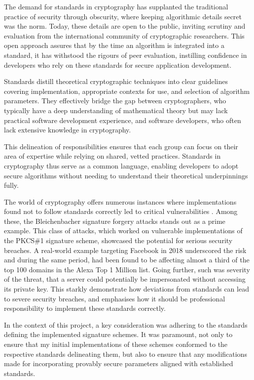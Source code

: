 \documentclass[]{final_report}
\theoremstyle{definition}
\begin{document}
The demand for standards in cryptography has supplanted the traditional practice of security through obscurity, where keeping algorithmic details secret was the norm. Today, these details are open to the public, inviting scrutiny and evaluation from the international community of cryptographic researchers. This open approach assures that by the time an algorithm is integrated into a standard, it has withstood the rigours of peer evaluation, instilling confidence in developers who rely on these standards for secure application development.

Standards distill theoretical cryptographic techniques into clear guidelines covering implementation, appropriate contexts for use, and selection of algorithm parameters. They effectively bridge the gap between cryptographers, who typically have a deep understanding of mathematical theory but may lack practical software development experience, and software developers, who often lack extensive knowledge in cryptography.

This delineation of responsibilities ensures that each group can focus on their area of expertise while relying on shared, vetted practices. Standards in cryptography thus serve as a common language, enabling developers to adopt secure algorithms without needing to understand their theoretical underpinnings fully.


The world of cryptography offers numerous instances where implementations found not to follow standards correctly led to critical vulnerabilities \cite{4223237, 10.1145/2382196.2382205, 10.1145/2382196.2382204,  bleichenbacher1998chosen}. Among these, the Bleichenbacher signature forgery attacks \cite{finney2006bleichenbacher, kuhn2008variants} stands out as a prime example. This class of attacks, which worked on vulnerable implementations of the PKCS\#1 signature scheme, showcased the potential for serious security breaches. A real-world example targeting Facebook  \cite{bock2018return} in 2018 underscored the risk and during the same period, had been found to be affecting almost a third of the top 100 domains in the Alexa Top 1 Million list. Going further, such was severity of the threat, that a server could potentially be impersonated without accessing its private key. This starkly demonstrate how deviations from standards can lead to severe security breaches, and emphasises how it should be professional responsibility to implement these standards correctly.


In the context of this project, a key consideration was adhering to the standards defining the implemented signature schemes. It was paramount, not only to ensure that my initial implementations of these schemes conformed to the respective standards delineating them, but also to ensure that any modifications made for incorporating provably secure parameters aligned with established standards.
\end{document}
